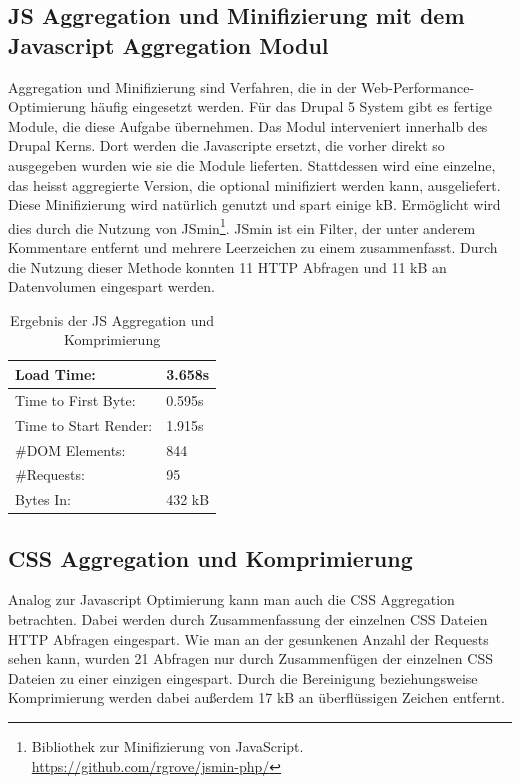 \subsection{JS Aggregation und Minifizierung mit dem Javascript Aggregation Modul}
Aggregation und Minifizierung sind Verfahren, die in der Web-Performance-Optimierung häufig eingesetzt werden. Für das Drupal 5 System gibt es fertige Module, die diese Aufgabe übernehmen. Das Modul interveniert innerhalb des Drupal Kerns. Dort werden die Javascripte ersetzt, die vorher direkt so ausgegeben wurden wie sie die Module lieferten. Stattdessen wird eine einzelne, das heisst aggregierte Version, die optional minifiziert werden kann, ausgeliefert. Diese Minifizierung wird natürlich genutzt und spart einige kB. Ermöglicht wird dies durch die Nutzung von JSmin\footnote{Bibliothek zur Minifizierung von JavaScript. \url{https://github.com/rgrove/jsmin-php/}}. JSmin ist ein Filter, der unter anderem Kommentare entfernt und mehrere Leerzeichen zu einem zusammenfasst. Durch die Nutzung dieser Methode konnten 11 HTTP Abfragen und 11 kB an Datenvolumen eingespart werden.

\begin{table}[!ht]
\centering
\caption{Ergebnis der JS Aggregation und Komprimierung}
    \begin{tabular}{ | p{3cm} | p{1.5cm} | }
    \hline
    Load Time: 			& 3.658s 	\\ \hline
    Time to First Byte:		& 0.595s  	\\ \hline
    Time to Start Render:	& 1.915s	\\ \hline
    \#DOM Elements:		& 844 		\\ \hline
    \#Requests:			& 95 		\\ \hline
    Bytes In:			& 432 kB 	\\ \hline
    \hline
    \end{tabular}
\end{table}

\subsection{CSS Aggregation und Komprimierung}
Analog zur Javascript Optimierung kann man auch die CSS Aggregation betrachten. Dabei werden durch Zusammenfassung der einzelnen CSS Dateien HTTP Abfragen eingespart. Wie man an der gesunkenen Anzahl der Requests sehen kann, wurden 21 Abfragen nur durch Zusammenfügen der einzelnen CSS Dateien zu einer einzigen eingespart. Durch die Bereinigung beziehungsweise Komprimierung werden dabei außerdem 17 kB an überflüssigen Zeichen entfernt. 

